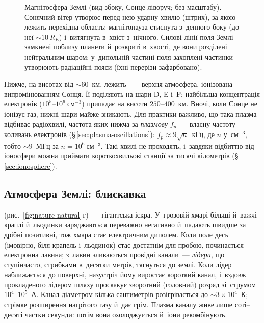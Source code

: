 \begin{figure}[ht]
\centering
{}
\caption{Магнітосфера Землі (вид збоку, Сонце ліворуч; без масштабу). Сонячний вітер утворює перед нею ударну хвилю (штрих), за якою лежить перехідна область; магнітопауза стиснута з~денного боку (до неї $\sim10\,R_E$) і~витягнута в~хвіст з~нічного. Силові лінії поля Землі замкнені поблизу планети й~розкриті в~хвості, де вони розділені нейтральним шаром; у~дипольній частині поля захоплені частинки утворюють радіаційні пояси (їхні перерізи зафарбовано).}
\label{fig:nature-magnetosphere}
\end{figure}

Нижче, на висотах від $\sim60$~км, лежить ~--- верхня атмосфера, іонізована випромінюванням Сонця. Її поділяють на шари D, E і~F; найбільша концентрація електронів
($10^{5}$--$10^{6}~\mathrm{см}^{-3}$) припадає на висоти $250$--$400$~км. Вночі, коли Сонце не іонізує газ, нижні шари майже зникають.
Для практики важливо, що така плазма відбиває радіохвилі, частота яких нижча за \emph{плазмову} $f_p$~--- власну частоту коливань електронів (§\,\ref{sec:plasma-oscillations}):
$f_p\approx9\sqrt{n}$~кГц, де $n$ у~$\mathrm{см}^{-3}$, тобто $\sim9$~МГц за $n=10^{6}~\mathrm{см}^{-3}$.
Такі хвилі не проходять, і~завдяки відбиттю від іоносфери можна приймати короткохвильові станції за тисячі кілометрів (§\,\ref{sec:ionosphere}).

\subsection*{Атмосфера Землі: блискавка}

 (рис.~\ref{fig:nature-natural}\,г)~--- гігантська іскра. У~грозовій хмарі більші й~важчі краплі й~льодинки заряджаються переважно негативно й~падають швидше за дрібні позитивні,
тож хмара стає електричним диполем. Коли поле десь (імовірно, біля крапель і~льодинок) стає достатнім для пробою, починається електронна лавина; з~лавин зливаються провідні канали~---
\emph{лідери}, що ступінчасто, стрибками в~десятки метрів, тягнуться до землі. Коли лідер наближається до поверхні, назустріч йому виростає короткий канал,
і~вздовж прокладеного лідером шляху проскакує зворотний (головний) розряд зі~струмом $10^{4}$--$10^{5}$~А. Канал діаметром кілька сантиметрів розігрівається до $\sim3\times10^{4}$~К;
стрімке розширення нагрітого газу й~дає грім. Плазма каналу живе лише соті--десяті частки секунди: потім вона охолоджується й~іони рекомбінують.


